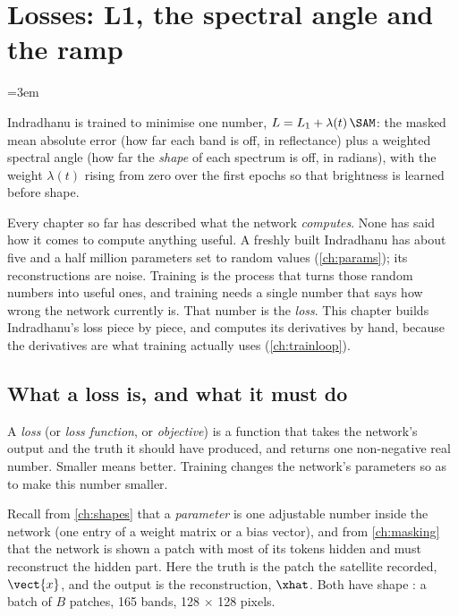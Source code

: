 \chapter{Losses: L1, the spectral angle and the ramp}\label{ch:losses}
\begingroup\emergencystretch=3em %

\begin{onething}
Indradhanu is trained to minimise one number, $L = L_1 + \lambda(t)\,\SAM$: the masked mean
absolute error (how far each band is off, in reflectance) plus a weighted spectral angle (how
far the \emph{shape} of each spectrum is off, in radians), with the weight $\lambda(t)$ rising
from zero over the first epochs so that brightness is learned before shape.
\end{onething}

Every chapter so far has described what the network \emph{computes}. None has said how it comes
to compute anything useful. A freshly built Indradhanu has about five and a half million
parameters set to random values (\cref{ch:params}); its reconstructions are noise. Training is
the process that turns those random numbers into useful ones, and training needs a single
number that says how wrong the network currently is. That number is the \emph{loss}. This
chapter builds Indradhanu's loss piece by piece, and computes its derivatives by hand, because
the derivatives are what training actually uses (\cref{ch:trainloop}).

\section{What a loss is, and what it must do}\label{sec:losses:what}

\begin{definition}[Loss]
A \emph{loss} (or \emph{loss function}, or \emph{objective}) is a function that takes the
network's output and the truth it should have produced, and returns one non-negative real
number. Smaller means better. Training changes the network's parameters so as to make this
number smaller.
\end{definition}

Recall from \cref{ch:shapes} that a \emph{parameter} is one adjustable number
inside the network (one entry of a weight matrix or a bias vector), and from \cref{ch:masking}
that the network is shown a patch with most of its tokens hidden and must reconstruct the
hidden part. Here the truth is the patch the satellite recorded, $\vect{x}$, and the output is
the reconstruction, $\xhat$. Both have shape : a batch of $B$ patches,
165 bands, 128 $\times$ 128 pixels.

